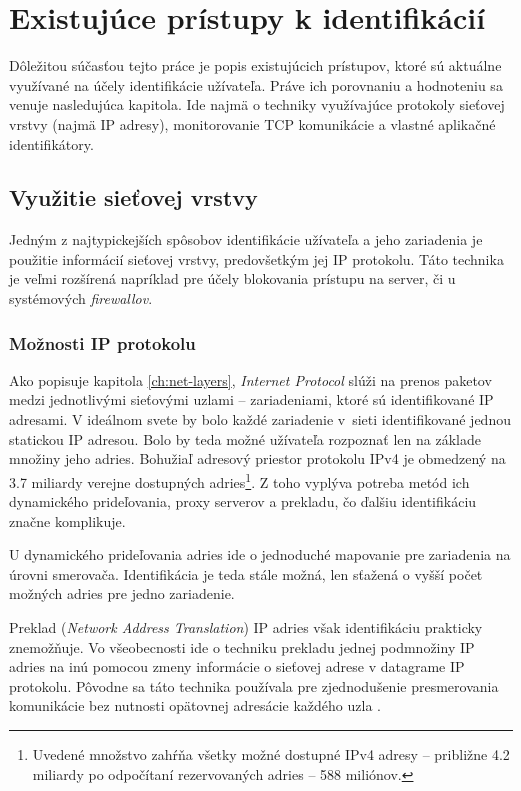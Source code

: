 \documentclass[
  digital, %
  oneside, %
  table,   %
  lof,     %
  nolot,   %
  nocover
]{fithesis3}
\begin{document}
\chapter{Existujúce prístupy k identifikácií}
\label{ch:existing}
Dôležitou súčasťou tejto práce je popis existujúcich prístupov, ktoré
sú aktuálne využívané na účely identifikácie užívateľa. Práve ich porovnaniu
a hodnoteniu sa venuje nasledujúca kapitola.
Ide najmä o techniky využívajúce protokoly sieťovej vrstvy (najmä IP adresy),
monitorovanie TCP komunikácie a vlastné aplikačné identifikátory.

\section{Využitie sieťovej vrstvy}
Jedným z najtypickejších spôsobov identifikácie užívateľa a jeho zariadenia je
použitie informácií sieťovej vrstvy, predovšetkým jej IP protokolu.
Táto technika je veľmi rozšírená napríklad pre účely blokovania prístupu na
server, či u systémových \textit{firewallov}.

\subsection{Možnosti IP protokolu }
Ako popisuje kapitola \ref{ch:net-layers}, \textit{Internet Protocol} slúži na
prenos paketov medzi jednotlivými sieťovými uzlami -- zariadeniami, ktoré sú
identifikované IP adresami. V ideálnom svete by bolo každé zariadenie v~sieti
identifikované jednou statickou IP adresou. Bolo by teda možné užívateľa
rozpoznať len na základe množiny jeho adries. Bohužiaľ adresový priestor
protokolu IPv4 je obmedzený na 3.7 miliardy verejne dostupných adries\footnote{
  Uvedené množstvo zahŕňa všetky možné dostupné IPv4 adresy -- približne 4.2
  miliardy po odpočítaní rezervovaných adries -- 588 miliónov.
}.
Z toho vyplýva potreba metód ich dynamického prideľovania, proxy serverov a
prekladu, čo ďalšiu identifikáciu značne komplikuje.

U dynamického prideľovania adries ide o jednoduché mapovanie pre zariadenia
na úrovni smerovača. Identifikácia je teda stále možná, len sťažená o vyšší
počet možných adries pre jedno zariadenie.

Preklad (\textit{Network Address Translation}) IP adries však identifikáciu
prakticky znemožňuje. Vo všeobecnosti ide o techniku prekladu jednej podmnožiny
IP adries na inú pomocou zmeny informácie o sieťovej adrese v datagrame IP
protokolu. Pôvodne sa táto technika používala pre zjednodušenie presmerovania
komunikácie bez nutnosti opätovnej adresácie každého uzla \cite{Huston:NAT}. 
\end{document}
